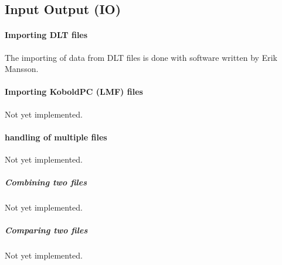 \newpage
\subsection{Input Output (IO)}
\paragraph{Importing DLT files} The importing of data from DLT files is done with software written by Erik Mansson. 

\paragraph{Importing KoboldPC (LMF) files} Not yet implemented.

\paragraph{handling of multiple files} Not yet implemented.

\subparagraph{Combining two files} Not yet implemented.

\subparagraph{Comparing two files} Not yet implemented.

